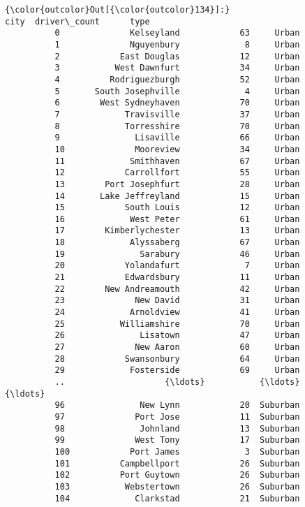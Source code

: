 \documentclass[11pt]{article}
\begin{document}
\begin{Verbatim}[commandchars=\\\{\}]
{\color{outcolor}Out[{\color{outcolor}134}]:}                      city  driver\_count      type
          0              Kelseyland            63     Urban
          1              Nguyenbury             8     Urban
          2            East Douglas            12     Urban
          3           West Dawnfurt            34     Urban
          4          Rodriguezburgh            52     Urban
          5       South Josephville             4     Urban
          6        West Sydneyhaven            70     Urban
          7             Travisville            37     Urban
          8             Torresshire            70     Urban
          9               Lisaville            66     Urban
          10              Mooreview            34     Urban
          11             Smithhaven            67     Urban
          12            Carrollfort            55     Urban
          13        Port Josephfurt            28     Urban
          14       Lake Jeffreyland            15     Urban
          15            South Louis            12     Urban
          16             West Peter            61     Urban
          17        Kimberlychester            13     Urban
          18             Alyssaberg            67     Urban
          19               Sarabury            46     Urban
          20            Yolandafurt             7     Urban
          21            Edwardsbury            11     Urban
          22        New Andreamouth            42     Urban
          23              New David            31     Urban
          24             Arnoldview            41     Urban
          25           Williamshire            70     Urban
          26               Lisatown            47     Urban
          27              New Aaron            60     Urban
          28            Swansonbury            64     Urban
          29             Fosterside            69     Urban
          ..                    {\ldots}           {\ldots}       {\ldots}
          96               New Lynn            20  Suburban
          97              Port Jose            11  Suburban
          98               Johnland            13  Suburban
          99              West Tony            17  Suburban
          100            Port James             3  Suburban
          101          Campbellport            26  Suburban
          102          Port Guytown            26  Suburban
          103           Webstertown            26  Suburban
          104             Clarkstad            21  Suburban

\end{Verbatim}
\end{document}
